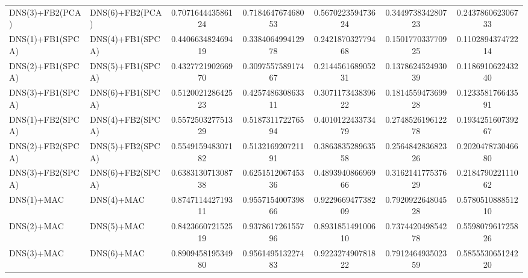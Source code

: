 \begin{table}[H]
\begin{tabular}{llSSSSS}
DNS(3)+FB2(PCA) & DNS(6)+FB2(PCA) & 0.707164443586124 & 0.718464767468053 & 0.567022359473624 & 0.344973834280723 & 0.243786062306733 \\ 
DNS(1)+FB1(SPCA) & DNS(4)+FB1(SPCA) & 0.440663482469419 & 0.338406499412978 & 0.242187032779468 & 0.150177033770925 & 0.110289437472214 \\ 
DNS(2)+FB1(SPCA) & DNS(5)+FB1(SPCA) & 0.432772190266970 & 0.309755758917467 & 0.214456168905231 & 0.137862452493039 & 0.118691062243240 \\ 
DNS(3)+FB1(SPCA) & DNS(6)+FB1(SPCA) & 0.512002128642523 & 0.425748630863311 & 0.307117343839622 & 0.181455947369928 & 0.123358176643591 \\ 
DNS(1)+FB2(SPCA) & DNS(4)+FB2(SPCA) & 0.557250327751329 & 0.518731172276594 & 0.401012243373479 & 0.274852619612278 & 0.193425160739267 \\ 
DNS(2)+FB2(SPCA) & DNS(5)+FB2(SPCA) & 0.554915948307182 & 0.513216920721191 & 0.386383528963558 & 0.256484283682326 & 0.202047873046680 \\ 
DNS(3)+FB2(SPCA) & DNS(6)+FB2(SPCA) & 0.638313071308738 & 0.625151206745336 & 0.489394086696966 & 0.316214177537629 & 0.218479022111062 \\ 
DNS(1)+MAC & DNS(4)+MAC & 0.874711442719311 & 0.955715400739866 & 0.922966947738209 & 0.792092264804528 & 0.578051088851210 \\ 
DNS(2)+MAC & DNS(5)+MAC & 0.842366072152519 & 0.937861726155796 & 0.893185149100610 & 0.737442049854278 & 0.559807961725826 \\ 
DNS(3)+MAC & DNS(6)+MAC & 0.890945819534980 & 0.956149513227483 & 0.922327490781822 & 0.791246493502359 & 0.585553065124220 \\ \bottomrule 
\end{tabular}
\end{table}


